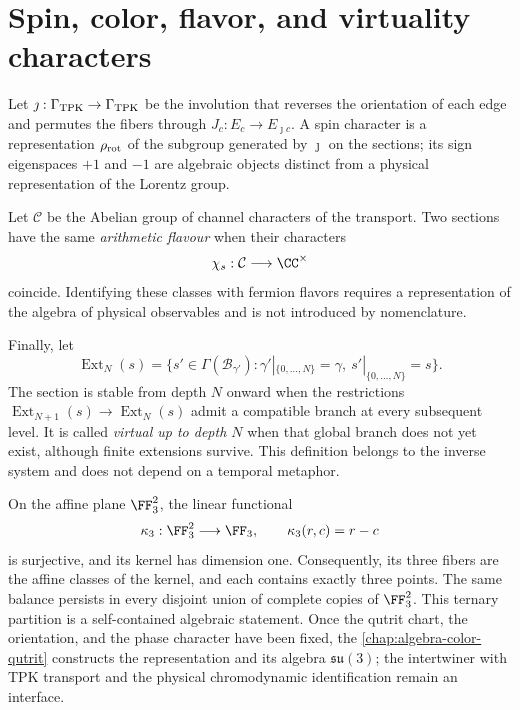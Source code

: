 \section{Spin, color, flavor, and virtuality characters}

Let \(\jmath:\Gamma_{\rm TPK}\to\Gamma_{\rm TPK}\) be the involution that reverses
the orientation of each edge and permutes the fibers through
\(J_c:E_c\to E_{\jmath c}\). A spin character is a representation
\(\rho_{\rm rot}\) of the subgroup generated by \(\jmath\) on the sections;
its sign eigenspaces \(+1\) and \(-1\) are algebraic objects distinct
from a physical representation of the Lorentz group.

Let \(\mathcal C\) be the Abelian group of channel characters of the transport.
Two sections have the same \emph{arithmetic flavour} when their characters
\[
 \chi_s:\mathcal C\longrightarrow\CC^\times
\]
coincide. Identifying these classes with fermion flavors requires
a representation of the algebra of physical observables and is not introduced by
nomenclature.

Finally, let
\[
 \operatorname{Ext}_N(s)=
 \{s'\in\Gamma(\mathcal B_{\gamma'}):
 \gamma'|_{\{0,\ldots,N\}}=\gamma,\ s'|_{\{0,\ldots,N\}}=s\}.
\]
The section is stable from depth \(N\) onward when the restrictions
\(\operatorname{Ext}_{N+1}(s)\to\operatorname{Ext}_N(s)\) admit a compatible branch
at every subsequent level. It is called \emph{virtual up to
depth \(N\)} when that global branch does not yet exist, although
finite extensions survive. This definition belongs to the inverse system and does not
depend on a temporal metaphor.

On the affine plane \(\FF_3^2\), the linear functional
\[
 \kappa_3:\FF_3^2\longrightarrow\FF_3,
 \qquad \kappa_3(r,c)=r-c
\]
is surjective, and its kernel has dimension one. Consequently, its three
fibers are the affine classes of the kernel, and each contains exactly three
points. The same balance persists in every disjoint union of complete
copies of \(\FF_3^2\). This ternary partition is a self-contained algebraic
statement. Once the qutrit chart, the orientation, and the phase character have been fixed,
the \cref{chap:algebra-color-qutrit} constructs the representation and its algebra
\(\mathfrak{su}(3)\); the intertwiner with TPK transport and the physical
chromodynamic identification remain an interface.
